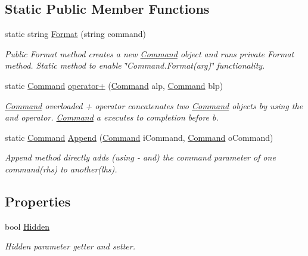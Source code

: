\subsection*{Static Public Member Functions}
\begin{DoxyCompactItemize}
\item 
static string \mbox{\hyperlink{class_cli_tool_space_1_1_command_a87f5cf560c99e6336acdb34d7f20e00a}{Format}} (string command)
\begin{DoxyCompactList}\small\item\em Public Format method creates a new \mbox{\hyperlink{class_cli_tool_space_1_1_command}{Command}} object and runs private Format method. Static method to enable \char`\"{}\+Command.\+Format(arg)\char`\"{} functionality. \end{DoxyCompactList}\item 
static \mbox{\hyperlink{class_cli_tool_space_1_1_command}{Command}} \mbox{\hyperlink{class_cli_tool_space_1_1_command_a2138b4c3df7aeee1aee67a188ff514b4}{operator+}} (\mbox{\hyperlink{class_cli_tool_space_1_1_command}{Command}} alp, \mbox{\hyperlink{class_cli_tool_space_1_1_command}{Command}} blp)
\begin{DoxyCompactList}\small\item\em \mbox{\hyperlink{class_cli_tool_space_1_1_command}{Command}} overloaded + operator concatenates two \mbox{\hyperlink{class_cli_tool_space_1_1_command}{Command}} objects by using the and operator. \mbox{\hyperlink{class_cli_tool_space_1_1_command}{Command}} a executes to completion before b. \end{DoxyCompactList}\item 
static \mbox{\hyperlink{class_cli_tool_space_1_1_command}{Command}} \mbox{\hyperlink{class_cli_tool_space_1_1_command_a9299086e0a3a63da064734d3169d5b2f}{Append}} (\mbox{\hyperlink{class_cli_tool_space_1_1_command}{Command}} i\+Command, \mbox{\hyperlink{class_cli_tool_space_1_1_command}{Command}} o\+Command)
\begin{DoxyCompactList}\small\item\em Append method directly adds (using -\/ and) the command parameter of one command(rhs) to another(lhs). \end{DoxyCompactList}\end{DoxyCompactItemize}
\subsection*{Properties}
\begin{DoxyCompactItemize}
\item 
bool \mbox{\hyperlink{class_cli_tool_space_1_1_command_a10f729897c950d77df6588c63845280b}{Hidden}}
\begin{DoxyCompactList}\small\item\em Hidden parameter getter and setter. \end{DoxyCompactList}\end{DoxyCompactItemize}


